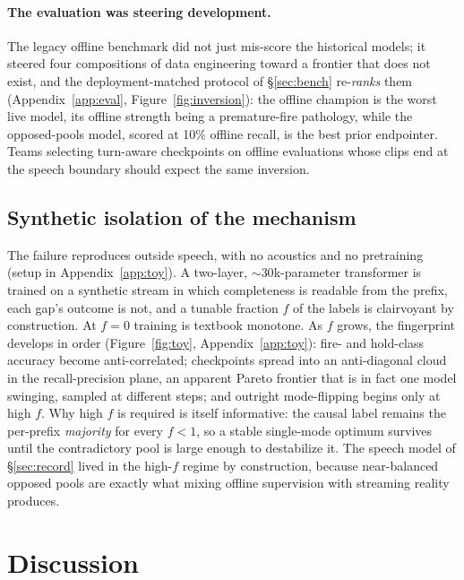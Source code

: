 \documentclass[11pt]{article}
\begin{document}
\paragraph{The evaluation was steering development.} The legacy offline benchmark did not just mis-score the historical models; it steered four compositions of data engineering toward a frontier that does not exist, and the deployment-matched protocol of \S\ref{sec:bench} re-\emph{ranks} them (Appendix~\ref{app:eval}, Figure~\ref{fig:inversion}): the offline champion is the worst live model, its offline strength being a premature-fire pathology, while the opposed-pools model, scored at 10\% offline recall, is the best prior endpointer. Teams selecting turn-aware checkpoints on offline evaluations whose clips end at the speech boundary should expect the same inversion.

\subsection{Synthetic isolation of the mechanism}
\label{sec:toy}

The failure reproduces outside speech, with no acoustics and no pretraining (setup in Appendix~\ref{app:toy}). A two-layer, ${\sim}30$k-parameter transformer is trained on a synthetic stream in which completeness is readable from the prefix, each gap's outcome is not, and a tunable fraction $f$ of the labels is clairvoyant by construction. At $f{=}0$ training is textbook monotone. As $f$ grows, the fingerprint develops in order (Figure~\ref{fig:toy}, Appendix~\ref{app:toy}): fire- and hold-class accuracy become anti-correlated; checkpoints spread into an anti-diagonal cloud in the recall-precision plane, an apparent Pareto frontier that is in fact one model swinging, sampled at different steps; and outright mode-flipping begins only at high $f$. Why high $f$ is required is itself informative: the causal label remains the per-prefix \emph{majority} for every $f{<}1$, so a stable single-mode optimum survives until the contradictory pool is large enough to destabilize it. The speech model of \S\ref{sec:record} lived in the high-$f$ regime by construction, because near-balanced opposed pools are exactly what mixing offline supervision with streaming reality produces.

\section{Discussion}
\label{sec:discussion}
\end{document}
